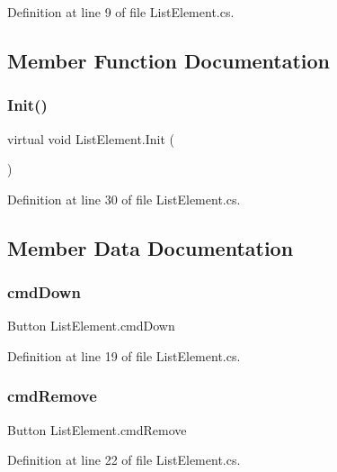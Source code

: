 Definition at line 9 of file List\+Element.\+cs.



\subsection{Member Function Documentation}
\mbox{\label{class_list_element_ab5913ed39be8e9c0e59bc4dae9bb1348}} 
\subsubsection{Init()}
{\footnotesize\ttfamily virtual void List\+Element.\+Init (\begin{DoxyParamCaption}{ }\end{DoxyParamCaption})\hspace{0.3cm}{\ttfamily [virtual]}}



Definition at line 30 of file List\+Element.\+cs.



\subsection{Member Data Documentation}
\mbox{\label{class_list_element_a2356548516076c0f51c76338d982c57a}} 
\subsubsection{cmd\+Down}
{\footnotesize\ttfamily Button List\+Element.\+cmd\+Down}



Definition at line 19 of file List\+Element.\+cs.

\mbox{\label{class_list_element_a9522f03e574dbdd1d95af17337b2ed3c}} 
\subsubsection{cmd\+Remove}
{\footnotesize\ttfamily Button List\+Element.\+cmd\+Remove}



Definition at line 22 of file List\+Element.\+cs.

\mbox{\label{class_list_element_a74a9e463a965e46764661b852f499ec7}} 
